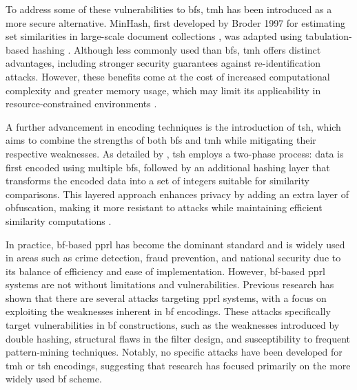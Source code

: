 To address some of these vulnerabilities to \ac{bf}s, \ac{tmh} has been introduced as a more secure alternative. 
MinHash, first developed by Broder 1997 for estimating set similarities in large-scale document collections \cite{broder1997resemblance}, was adapted using tabulation-based hashing \cite{smith2017secure}.
Although less commonly used than \ac{bf}s, \ac{tmh} offers distinct advantages, including stronger security guarantees against re-identification attacks. 
However, these benefits come at the cost of increased computational complexity and greater memory usage, which may limit its applicability in resource-constrained environments \cite{smith2017secure}.

A further advancement in encoding techniques is the introduction of \ac{tsh}, which aims to combine the strengths of both \ac{bf}s and \ac{tmh} while mitigating their respective weaknesses.
As detailed by \cite{ranbaduge2020secure}, \ac{tsh} employs a two-phase process: data is first encoded using multiple \ac{bf}s, followed by an additional hashing layer that transforms the encoded data into a set of integers suitable for similarity comparisons. 
This layered approach enhances privacy by adding an extra layer of obfuscation, making it more resistant to attacks while maintaining efficient similarity computations \cite{vidanage2020graph, ranbaduge2020secure}.

In practice, \ac{bf}-based \ac{pprl} has become the dominant standard and is widely used in areas such as crime detection, fraud prevention, and national security due to its balance of efficiency and ease of implementation.
However, \ac{bf}-based \ac{pprl} systems are not without limitations and vulnerabilities. 
Previous research has shown that there are several attacks targeting \ac{pprl} systems, with a focus on exploiting the weaknesses inherent in \ac{bf} encodings.
These attacks specifically target vulnerabilities in \ac{bf} constructions, such as the weaknesses introduced by double hashing, structural flaws in the filter design, and susceptibility to frequent pattern-mining techniques. 
Notably, no specific attacks have been developed for \ac{tmh} or \ac{tsh} encodings, suggesting that research has focused primarily on the more widely used \ac{bf} scheme. \cite{vidanage2020graph}


